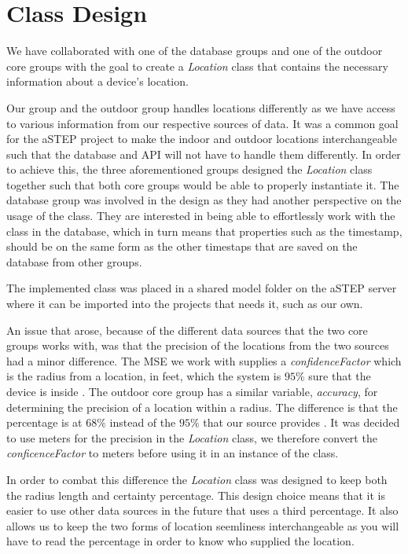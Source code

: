 \section{Class Design}\label{sec:class_design}
We have collaborated with one of the database groups and one of the outdoor core groups with the goal to create a \textit{Location} class that contains the necessary information about a device's location. 

Our group and the outdoor group handles locations differently as we have access to various information from our respective sources of data. It was a common goal for the aSTEP project to make the indoor and outdoor locations interchangeable such that the database and API will not have to handle them differently. In order to achieve this, the three aforementioned groups designed the \textit{Location} class together such that both core groups would be able to properly instantiate it. The database group was involved in the design as they had another perspective on the usage of the class. They are interested in being able to effortlessly work with the class in the database, which in turn means that properties such as the timestamp, should be on the same form as the other timestaps that are saved on the database from other groups. 

The implemented class was placed in a shared model folder on the aSTEP server %
where it can be imported into the projects that needs it, such as our own. 

An issue that arose, because of the different data sources that the two core groups works with, was that the precision of the locations from the two sources had a minor difference. The MSE we work with supplies a \textit{confidenceFactor} which is the radius from a location, in feet, which the system is $95\%$ sure that the device is inside \cite{MSE_faq}. The outdoor core group has a similar variable, \textit{accuracy}, for determining the precision of a location within a radius. The difference is that the percentage is at $68\%$ instead of the $95\%$ that our source provides \cite{android_getAccuracy}. It was decided to use meters for the precision in the \textit{Location} class, we therefore convert the \textit{conficenceFactor} to meters before using it in an instance of the class. 

In order to combat this difference the \textit{Location} class was designed to keep both the radius length and certainty percentage. This design choice means that it is easier to use other data sources in the future that uses a third percentage. It also allows us to keep the two forms of location seemliness interchangeable as you will have to read the percentage in order to know who supplied the location.